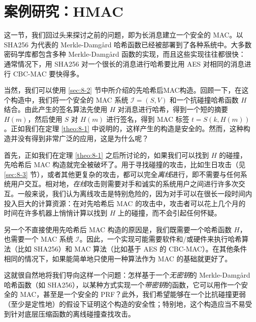 \section{案例研究：HMAC}\label{sec:8-7}

这一节，我们回过头来探讨之前的问题，即为长消息建立一个安全的 MAC。以 SHA256 为代表的 Merkle-Damg{\aa}rd 哈希函数已经被部署到了各种系统中。大多数密码学库都包含多种 Merkle-Damg{\aa}rd 函数的实现，而且这些实现往往都很快：通常情况下，用 SHA256 对一个很长的消息进行哈希要比用 AES 对相同的消息进行 CBC-MAC 要快得多。

当然，我们可以使用 \ref{sec:8-2} 节中所介绍的先哈希后MAC构造。回顾一下，在这个构造中，我们将一个安全的 MAC 系统 $\mathcal{I}=(S,V)$ 和一个抗碰撞哈希函数 $H$ 结合。由此产生的签名算法先使用 $H$ 对消息进行哈希，得到一个短的摘要 $H(m)$，然后使用 $S$ 对 $H(m)$ 进行签名，得到 MAC 标签 $t=S(k,H(m))$。正如我们在定理 \ref{theo:8-1} 中说明的，这样产生的构造是安全的。然而，这种构造并没有得到非常广泛的应用，这是为什么呢？

首先，正如我们在定理 \ref{theo:8-1} 之后所讨论的，如果我们可以找到 $H$ 的碰撞，先哈希后 MAC 构造就完全被破坏了。用于寻找碰撞的攻击，比如生日攻击（见 \ref{sec:8-3} 节），或者其他更复杂的攻击，都可以完全\emph{离线}进行，即不需要与任何系统用户交互。相对地，\emph{在线}攻击则需要对手和诚实的系统用户之间进行许多次交互。一般来说，我们认为离线攻击是特别危险的，因为对手可以在很长一段时间内投入巨大的计算资源：在对先哈希后 MAC 的攻击中，攻击者可以花上几个月的时间在许多机器上悄悄计算以找到 $H$ 上的碰撞，而不会引起任何怀疑。

另一个不直接使用先哈希后 MAC 构造的原因是，我们既需要一个哈希函数 $H$，也需要一个 MAC 系统 $\mathcal{I}$。因此，一个实现可能需要软件和/或硬件来执行哈希算法（比如 SHA256）和 MAC 算法（比如基于 AES 的 CBC-MAC）。在其他条件相同的情况下，如果能简单地只使用一种算法作为 MAC 的基础就更好了。

这就很自然地将我们导向这样一个问题：怎样基于一个\emph{无密钥}的 Merkle-Damg{\aa}rd 哈希函数（如 SHA256），以某种方式实现一个\emph{带密钥}的函数，它可以用作一个安全的 MAC，甚至是一个安全的 PRF？此外，我们希望能够在一个比抗碰撞更弱（至少是定性地）的假设下证明这个构造的安全性；特别地，这个构造应当不易受到针对底层压缩函数的离线碰撞查找攻击。


